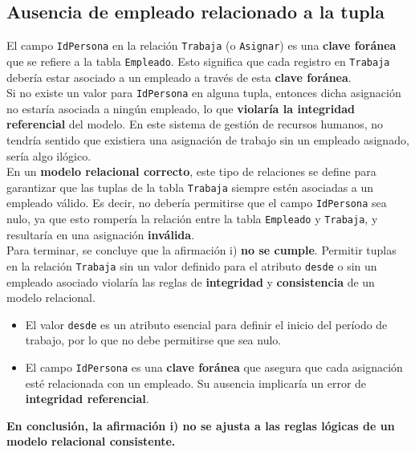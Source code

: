 \subsection{Ausencia de empleado relacionado a la tupla}

El campo \texttt{IdPersona} en la relación \texttt{Trabaja} (o \texttt{Asignar}) es una \textbf{clave foránea} que se refiere a la tabla \texttt{Empleado}. Esto significa que cada registro en \texttt{Trabaja} debería estar asociado a un empleado a través de esta \textbf{clave foránea}. \\

Si no existe un valor para \texttt{IdPersona} en alguna tupla, entonces dicha asignación no estaría asociada a ningún empleado, lo que \textbf{violaría la integridad referencial} del modelo. En este sistema de gestión de recursos humanos, no tendría sentido que existiera una asignación de trabajo sin un empleado asignado, sería algo ilógico. \\

En un \textbf{modelo relacional correcto}, este tipo de relaciones se define para garantizar que las tuplas de la tabla \texttt{Trabaja} siempre estén asociadas a un empleado válido. Es decir, no debería permitirse que el campo \texttt{IdPersona} sea nulo, ya que esto rompería la relación entre la tabla \texttt{Empleado} y \texttt{Trabaja}, y resultaría en una asignación \textbf{inválida}. \\
 


Para terminar, se concluye que la afirmación i) \textbf{no se cumple}. Permitir tuplas en la relación \texttt{Trabaja} sin un valor definido para el atributo \texttt{desde} o sin un empleado asociado violaría las reglas de \textbf{integridad} y \textbf{consistencia} de un modelo relacional.

\begin{itemize}
    \item El valor \texttt{desde} es un atributo esencial para definir el inicio del período de trabajo, por lo que no debe permitirse que sea nulo.
    \item El campo \texttt{IdPersona} es una \textbf{clave foránea} que asegura que cada asignación esté relacionada con un empleado. Su ausencia implicaría un error de \textbf{integridad referencial}.
\end{itemize}

\textbf {En conclusión, la afirmación i) no se ajusta a las reglas lógicas de un modelo relacional consistente.}
